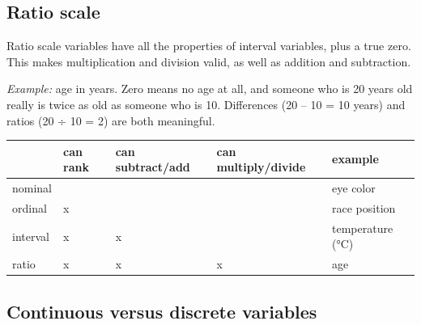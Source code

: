 \documentclass[
  letterpaper,
  DIV=11,
  numbers=noendperiod]{scrreprt}
\begin{document}
\subsection{Ratio scale}\label{ratio-scale}

Ratio scale variables have all the properties of interval variables,
plus a true zero. This makes multiplication and division valid, as well
as addition and subtraction.

\emph{Example:} age in years. Zero means no age at all, and someone who
is 20 years old really is twice as old as someone who is 10. Differences
(20 -- 10 = 10 years) and ratios (20 ÷ 10 = 2) are both meaningful.

\begin{longtable}[]{@{}
  >{\raggedright\arraybackslash}p{}
  >{\centering\arraybackslash}p{}
  >{\centering\arraybackslash}p{}
  >{\centering\arraybackslash}p{}
  >{\raggedright\arraybackslash}p{}@{}}
\toprule\noalign{}
\begin{minipage}[b]{\linewidth}\raggedright
\end{minipage} & \begin{minipage}[b]{\linewidth}\centering
can rank
\end{minipage} & \begin{minipage}[b]{\linewidth}\centering
can subtract/add
\end{minipage} & \begin{minipage}[b]{\linewidth}\centering
can multiply/divide
\end{minipage} & \begin{minipage}[b]{\linewidth}\raggedright
example
\end{minipage} \\
\midrule\noalign{}
\endhead
\bottomrule\noalign{}
\endlastfoot
nominal & & & & eye color \\
ordinal & x & & & race position \\
interval & x & x & & temperature (°C) \\
ratio & x & x & x & age \\
\end{longtable}

\subsection{Continuous versus discrete
variables}\label{continuous-versus-discrete-variables}
\end{document}
